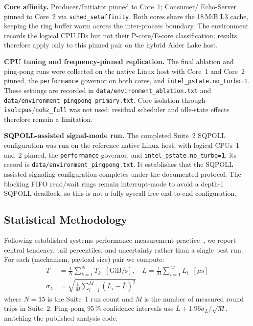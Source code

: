 \documentclass[10pt,conference]{IEEEtran}
\begin{document}
\textbf{Core affinity.}  Producer/Initiator pinned to Core~1; Consumer/
Echo-Server pinned to Core~2 via \texttt{sched\_setaffinity}.  Both cores
share the 18\,MiB L3 cache, keeping the ring buffer warm across the
inter-process boundary.  The environment records the logical CPU IDs but not
their P-core/E-core classification; results therefore apply only to this pinned
pair on the hybrid Alder Lake host.

\textbf{CPU tuning and frequency-pinned replication.}  The final ablation and
ping-pong runs were collected on the native Linux host with Core~1 and Core~2
pinned, the \texttt{performance} governor on both cores, and
\texttt{intel\_pstate.no\_turbo=1}.  These settings are recorded in
\texttt{data/environment\_ablation.txt} and
\texttt{data/environment\_pingpong\_primary.txt}.  Core isolation through
\texttt{isolcpus}/\texttt{nohz\_full} was not used; residual scheduler and
idle-state effects therefore remain a limitation.

\textbf{SQPOLL-assisted signal-mode run.}  The completed Suite~2 SQPOLL
configuration was run on the reference native Linux host, with logical CPUs~1 and~2 pinned,
the \texttt{performance} governor, and
\texttt{intel\_pstate.no\_turbo=1}; its record is
\texttt{data/environment\_pingpong.txt}.  It establishes that the SQPOLL
assisted signaling configuration completes under the documented protocol. The
blocking FIFO read/wait rings remain interrupt-mode to avoid a depth-1 SQPOLL
deadlock, so this is not a fully syscall-free end-to-end configuration.

\subsection{Statistical Methodology}

Following established systems-performance measurement practice~\cite{gregg2020},
we report central tendency, tail percentiles, and uncertainty rather than a
single best run. For each (mechanism, payload size) pair we compute:
\begin{align*}
  \bar{T} &= \frac{1}{N}\sum_{k=1}^{N} T_k \;\;[\text{GiB/s}], \quad
  \bar{L} = \frac{1}{M}\sum_{i=1}^{M} L_i \;\;[\mu\text{s}] \\
  \sigma_L &= \sqrt{\frac{1}{M}\sum_{i=1}^{M} (L_i - \bar{L})^2}
\end{align*}
where $N=15$ is the Suite~1 run count and $M$ is the number of measured
round trips in Suite~2.  Ping-pong 95\,\% confidence intervals use
$\bar{L} \pm 1.96\sigma_L/\sqrt{M}$, matching the published analysis code.
\end{document}
